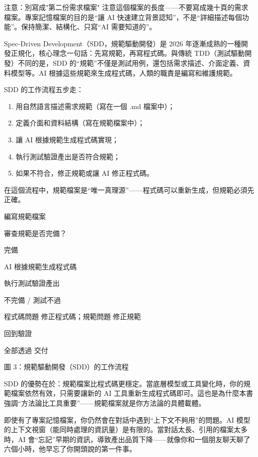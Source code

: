 \begin{tcbwarn}{注意：別寫成"第二份需求檔案"}
注意這個檔案的長度——不要寫成幾十頁的需求檔案。專案記憶檔案的目的是“讓 AI 快速建立背景認知”，不是“詳細描述每個功能”。保持簡潔、結構化、只寫“AI 需要知道的”。

\end{tcbwarn}


Spec-Driven Development（SDD，規範驅動開發）是 2026 年逐漸成熟的一種開發正規化，核心理念一句話：先寫規範，再寫程式碼。與傳統 TDD（測試驅動開發）不同的是，SDD 的“規範”不僅是測試用例，還包括需求描述、介面定義、資料模型等。AI 根據這些規範來生成程式碼，人類的職責是編寫和維護規範。

SDD 的工作流程五步走：

\begin{enumerate}
  \item 用自然語言描述需求規範（寫在一個 .md 檔案中）；
  \item 定義介面和資料結構（寫在規範檔案中）；
  \item 讓 AI 根據規範生成程式碼實現；
  \item 執行測試驗證產出是否符合規範；
  \item 如果不符合，修正規範或讓 AI 修正程式碼。
\end{enumerate}

在這個流程中，規範檔案是“唯一真理源”——程式碼可以重新生成，但規範必須先正確。

編寫規範檔案

審查規範是否完備？

完備

AI 根據規範生成程式碼

執行測試驗證產出

不完備 / 測試不過

程式碼問題 修正程式碼；規範問題 修正規範

回到驗證

全部透過 交付

\begin{center}\small\color{gray}圖 3：規範驅動開發（SDD）的工作流程\end{center}

SDD 的優勢在於：規範檔案比程式碼更穩定。當底層模型或工具變化時，你的規範檔案依然有效，只需要讓新的 AI 工具重新生成程式碼即可。這也是為什麼本書強調“方法論比工具重要”——規範檔案就是你方法論的具體載體。


即使有了專案記憶檔案，你仍然會在對話中遇到“上下文不夠用”的問題。AI 模型的上下文視窗（能同時處理的資訊量）是有限的。當對話太長、引用的檔案太多時，AI 會“忘記”早期的資訊，導致產出品質下降——就像你和一個朋友聊天聊了六個小時，他早忘了你開頭說的第一件事。

